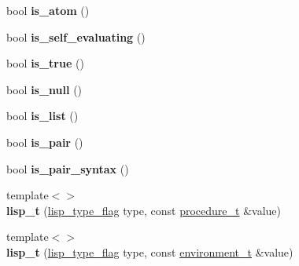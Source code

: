 \begin{DoxyCompactItemize}
bool {\bfseries is\+\_\+atom} ()
\item 
\mbox{\label{structlisp__t_a3e5c43cf5de9bfbd4f65e85384553da4}} 
bool {\bfseries is\+\_\+self\+\_\+evaluating} ()
\item 
\mbox{\label{structlisp__t_afe1a04de73d94cdc3464c57015943885}} 
bool {\bfseries is\+\_\+true} ()
\item 
\mbox{\label{structlisp__t_a1e7e3371571d50cd5704833db1520b46}} 
bool {\bfseries is\+\_\+null} ()
\item 
\mbox{\label{structlisp__t_ac991f97b3c78b0831bab87b78c81caf3}} 
bool {\bfseries is\+\_\+list} ()
\item 
\mbox{\label{structlisp__t_a2bc45fdc33116b2bfd96d16ca3c2e444}} 
bool {\bfseries is\+\_\+pair} ()
\item 
\mbox{\label{structlisp__t_ab91960538f83af8e2967f7b4e373a18a}} 
bool {\bfseries is\+\_\+pair\+\_\+syntax} ()
\item 
\mbox{\label{structlisp__t_ae954f28ed86c5a16cc5962d7fac0b930}} 
{\footnotesize template$<$$>$ }\\{\bfseries lisp\+\_\+t} (\mbox{\hyperlink{lisp__type__flag_8hpp_a055b7e4c72b7a614806ae1225539b99f}{lisp\+\_\+type\+\_\+flag}} type, const \mbox{\hyperlink{classprocedure__t}{procedure\+\_\+t}} \&value)
\item 
\mbox{\label{structlisp__t_a7f359f30c0ceabb9c53350992549b312}} 
{\footnotesize template$<$$>$ }\\{\bfseries lisp\+\_\+t} (\mbox{\hyperlink{lisp__type__flag_8hpp_a055b7e4c72b7a614806ae1225539b99f}{lisp\+\_\+type\+\_\+flag}} type, const \mbox{\hyperlink{classenvironment__t}{environment\+\_\+t}} \&value)
\end{DoxyCompactItemize}
